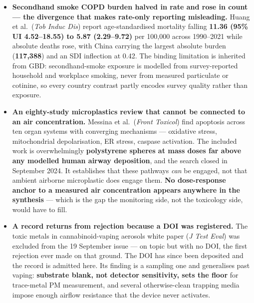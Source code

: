 \documentclass[10pt]{article}
\begin{document}
\begin{itemize}
{seasonal.} \textbf{The PubMed sensing query returned zero}, OpenAlex returned HTTP 429 and
arXiv HTTP 406 --- so the entire instrumentation and atmospheric-measurement side of this
window rests on the Crossref-by-ISSN leg, which deposits titles without abstracts. Of the
twelve admitted records, \textbf{five assert no finding at all}, and among them are the two
most operationally relevant titles of the day: a spatiotemporal characterisation of
pollutants \textbf{within subway stations} and a process-resolved characterisation of
\textbf{airborne mixtures in plastic-button manufacturing}. Both are on the deferred
re-query list. With OpenAlex per-work and Semantic Scholar both established as dead
recovery routes (18 and 19 September respectively), waiting is now the only route there is.
\item \textbf{Secondhand smoke COPD burden halved in rate and rose in count --- the
divergence that makes rate-only reporting misleading.} Huang et al.\ (\textit{Tob Induc
Dis}) report age-standardised mortality falling \textbf{11.36 (95\% UI 4.52--18.55) to
5.87 (2.29--9.72)} per 100,000 across 1990--2021 while absolute deaths rose, with China
carrying the largest absolute burden (\textbf{117,388}) and an SDI inflection at 0.42. The
binding limitation is inherited from GBD: secondhand-smoke exposure is modelled from
survey-reported household and workplace smoking, never from measured particulate or
cotinine, so every country contrast partly encodes survey quality rather than exposure.
\item \textbf{An eighty-study microplastics review that cannot be connected to an air
concentration.} Messina et al.\ (\textit{Front Toxicol}) find apoptosis across ten organ
systems with converging mechanisms --- oxidative stress, mitochondrial depolarisation, ER
stress, caspase activation. The included work is overwhelmingly \textbf{polystyrene
spheres at mass doses far above any modelled human airway deposition}, and the search
closed in September 2024. It establishes that these pathways \textit{can} be engaged, not
that ambient airborne microplastic does engage them. \textbf{No dose-response anchor to a
measured air concentration appears anywhere in the synthesis} --- which is the gap the
monitoring side, not the toxicology side, would have to fill.
\item \textbf{A record returns from rejection because a DOI was registered.} The toxic
metals in cannabinoid-vaping aerosols white paper (\textit{J Test Eval}) was excluded from
the 19 September issue --- on topic but with no DOI, the first rejection ever made on that
ground. The DOI has since been deposited and the record is admitted here. Its finding is a
sampling one and generalises past vaping: \textbf{substrate blank, not detector
sensitivity, sets the floor} for trace-metal PM measurement, and several otherwise-clean
trapping media impose enough airflow resistance that the device never activates.
\end{itemize}
\end{document}

